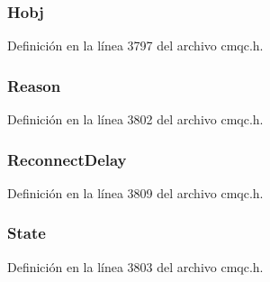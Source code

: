 \hypertarget{structtag_m_q_c_b_c_a9f8f179d9e85063e5a265231422a9bf2}{}
\subsubsection[{Hobj}]{ Hobj}\label{structtag_m_q_c_b_c_a9f8f179d9e85063e5a265231422a9bf2}


Definición en la línea 3797 del archivo cmqc.\+h.

\hypertarget{structtag_m_q_c_b_c_ac2f0378cb0c66c5f91625822e53d7bae}{}
\subsubsection[{Reason}]{ Reason}\label{structtag_m_q_c_b_c_ac2f0378cb0c66c5f91625822e53d7bae}


Definición en la línea 3802 del archivo cmqc.\+h.

\hypertarget{structtag_m_q_c_b_c_aebfaff32156463b0ead92d765681ff04}{}
\subsubsection[{Reconnect\+Delay}]{ Reconnect\+Delay}\label{structtag_m_q_c_b_c_aebfaff32156463b0ead92d765681ff04}


Definición en la línea 3809 del archivo cmqc.\+h.

\hypertarget{structtag_m_q_c_b_c_a55c511c2682a9c979eeb93d1a2259f42}{}
\subsubsection[{State}]{ State}\label{structtag_m_q_c_b_c_a55c511c2682a9c979eeb93d1a2259f42}


Definición en la línea 3803 del archivo cmqc.\+h.

